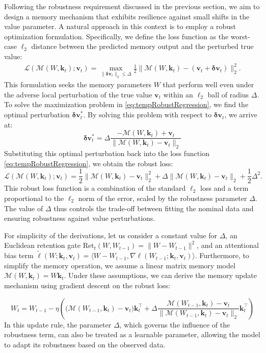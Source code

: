 \documentclass{article}
\newcommand{\vk}[0]{\mathbf{k}}
\newcommand{\vvv}[0]{\mathbf{v}}
\newcommand{\M}[0]{\mathcal{M}}
\theoremstyle{plain}
\theoremstyle{definition}
\theoremstyle{remark}
\newcommand{\head}[1]{\vspace{1.7mm}\noindent{{\textcolor{c2}{\bf #1.}}}}
\begin{document}
\head{Variant 3: Memory Robust to Value Shifts}
Following the robustness requirement discussed in the previous section, we aim to design a memory mechanism that exhibits resilience against small shifts in the value parameter. A natural approach in this context is to employ a robust optimization formulation. Specifically, we define the loss function as the worst-case $\ell_2$ distance between the predicted memory output and the perturbed true value:
\begin{align}
\label{eq:tempRobustRegression}
    \mathcal{L}(\M(W, \vk_t); \vvv_t) = \max_{\|\boldsymbol{\delta} \vvv_t\|_2 \leq \Delta }\frac{1}{2}\| \M(W,\vk_t) - (\vvv_t+\boldsymbol{\delta} \vvv_t) \|_2^2.
\end{align}
This formulation seeks the memory parameters $W$ that perform well even under the  adverse local perturbation of the true value $\mathbf{v}_t$ within an $\ell_2$ ball of radius $\Delta$.
To solve the maximization problem in \eqref{eq:tempRobustRegression}, we find the optimal perturbation $\boldsymbol{\delta}\mathbf{v}_t^*$. By solving this problem with respect to $\boldsymbol{\delta}\mathbf{v}_t$, we arrive at:
\[
\boldsymbol{\delta}\vvv_t^* = \Delta \frac{-\M(W,\vk_t) + \vvv_t}{\|\M(W,\vk_t) - \vvv_t\|_2}
\]
Substituting this optimal perturbation back into the loss function \eqref{eq:tempRobustRegression}, we obtain the robust loss:
\[
\mathcal{L}(\M(W, \vk_t); \vvv_t) = \frac{1}{2}\|\M(W,\vk_t) - \vvv_t\|_2^2 + \Delta \|\M(W,\vk_t) - \vvv_t\|_2 + \frac{1}{2}\Delta^2.
\]
This robust loss function is a combination of the standard $\ell_2$ loss and a term proportional to the $\ell_2$ norm of the error, scaled by the robustness parameter $\Delta$. The value of $\Delta$ thus controls the trade-off between fitting the nominal data and ensuring robustness against value perturbations.

For simplicity of the derivations, let us consider a constant value for $\Delta$, an Euclidean retention gate  $\mbox{Ret}_t\left(W,W_{t-1}\right) = \|W-W_{t-1}\|^2$, and an attentional bias term $\widetilde{\ell}(W;\mathbf{k}_t, \mathbf{v}_t) = \langle W-W_{t-1}, \nabla \ell(W_{t-1};\mathbf{k}_t, \mathbf{v}_t)\rangle$. Furthermore, to simplify the memory operation, we assume a linear matrix memory model $\M(W,\mathbf{k}_t) = W\mathbf{k}_t$. Under these assumptions, we can derive the memory update mechanism using gradient descent on the robust loss:

\[
W_{t} = W_{t-1} - \eta \left( \big(\M(W_{t-1},\vk_t)-\vvv_t\big) \vk_t^\top + \Delta \frac{\M(W_{t-1},\vk_t)-\vvv_t}{\|\M(W_{t-1},\vk_t)-\vvv_t\|_2}\vk_t^\top
\right)
\]
In this update rule, the parameter $\Delta$, which governs the influence of the robustness term, can also be treated as a learnable parameter, allowing the model to adapt its robustness based on the observed data.
\end{document}
